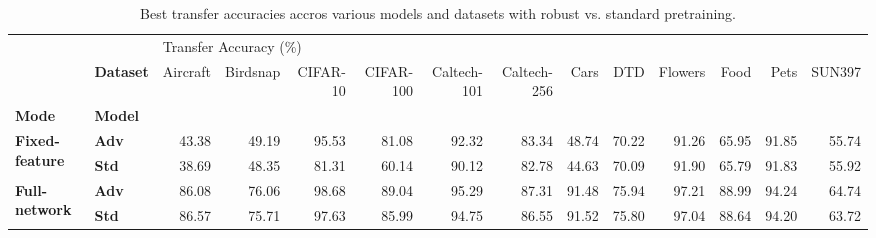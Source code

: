 \begin{table}
\centering
\caption{Best transfer accuracies accros various models and datasets with robust vs. standard pretraining.}
\label{table:headline-table}
\begin{tabular}{llrrrrrrrrrrrr}
\toprule
             & {} & \multicolumn{12}{l}{Transfer Accuracy (\%)} \\
             & \textbf{Dataset} &              Aircraft & Birdsnap & CIFAR-10 & CIFAR-100 & Caltech-101 & Caltech-256 &  Cars &   DTD & Flowers &  Food &  Pets & SUN397 \\
\textbf{Mode} & \textbf{Model} &                       &          &          &           &             &             &       &       &         &       &       &        \\
\midrule
\multirow{2}{*}{\textbf{Fixed-feature}} & \textbf{Adv} &                 43.38 &    49.19 &    95.53 &     81.08 &       92.32 &       83.34 & 48.74 & 70.22 &   91.26 & 65.95 & 91.85 &  55.74 \\
             & \textbf{Std} &                 38.69 &    48.35 &    81.31 &     60.14 &       90.12 &       82.78 & 44.63 & 70.09 &   91.90 & 65.79 & 91.83 &  55.92 \\
\cline{1-14}
\multirow{2}{*}{\textbf{Full-network}} & \textbf{Adv} &                 86.08 &    76.06 &    98.68 &     89.04 &       95.29 &       87.31 & 91.48 & 75.94 &   97.21 & 88.99 & 94.24 &  64.74 \\
             & \textbf{Std} &                 86.57 &    75.71 &    97.63 &     85.99 &       94.75 &       86.55 & 91.52 & 75.80 &   97.04 & 88.64 & 94.20 &  63.72 \\
\bottomrule
\end{tabular}
\end{table}
